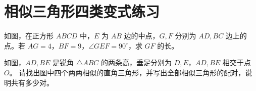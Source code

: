 \documentclass{exam-zh}
\begin{document}
\section*{相似三角形四类变式练习}



\begin{problem}[points=10]
  \noindent
  \begin{minipage}[t]{\dimexpr\linewidth-60mm-6mm\relax}
    \vspace{0pt}
    如图，在正方形 $ABCD$ 中，$E$ 为 $AB$ 边的中点，$G,F$ 分别为 $AD,BC$ 边上的点。若 $AG=4$，$BF=9$，$\angle GEF=90^\circ$，求 $GF$ 的长。

    
  \end{minipage}\hfill
  \begin{diagramcoltikz}{60mm}{先找两组直角，再观察 $GE\perp EF$ 带来的等角。}
  }
  \end{diagramcoltikz}
  \par\medskip
  \answerarea[54mm]
\end{problem}




\begin{problem}[points=10]
  \noindent
  \begin{minipage}[t]{\dimexpr\linewidth-60mm-6mm\relax}
    \vspace{0pt}
    如图，$AD,BE$ 是锐角 $\triangle ABC$ 的两条高，垂足分别为 $D,E$，$AD,BE$ 相交于点 $O$。
请找出图中四个两两相似的直角三角形，并写出全部相似三角形的配对，说明共有多少对。

    
  \end{minipage}\hfill
  \begin{diagramcoltikz}{60mm}{弧角未预先标出，请从两条高自己找等角。}
  }
  \end{diagramcoltikz}
  \par\medskip
  \answerarea[68mm]
\end{problem}



\end{document}
